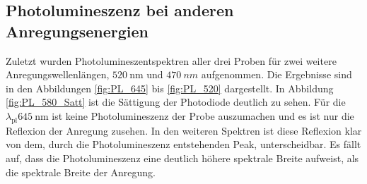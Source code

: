 \subsection{Photolumineszenz bei anderen Anregungsenergien}
\label{sec:weisslicht}
Zuletzt wurden Photolumineszentspektren aller drei Proben für zwei weitere
Anregungswellenlängen, $\SI{520}{\nano\meter}$ und $\SI{470}{nm}$ aufgenommen.
Die Ergebnisse sind in den Abbildungen \ref{fig:PL_645} bis \ref{fig:PL_520} dargestellt.
In Abbildung \ref{fig:PL_580_Satt} ist die Sättigung der Photodiode deutlich zu sehen.
Für die $\lambda_{\text{pl}}\SI{645}{\nano\meter}$ ist keine Photolumineszenz der
Probe auszumachen und es ist nur die Reflexion der Anregung zusehen.
In den weiteren Spektren ist diese Reflexion klar von dem,
durch die Photolumineszenz entstehenden Peak, unterscheidbar.
Es fällt auf, dass die Photolumineszenz eine deutlich höhere
spektrale Breite aufweist, als die spektrale Breite der Anregung.
